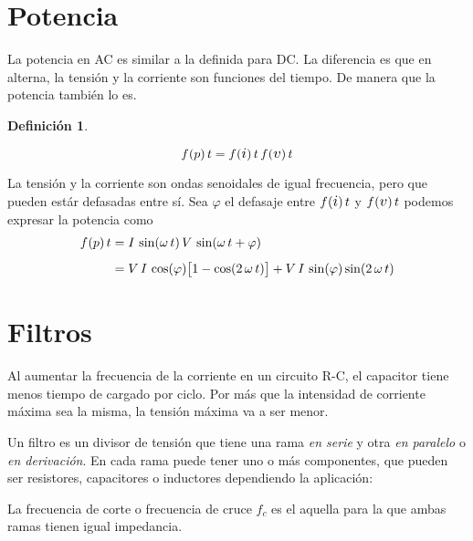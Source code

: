 \documentclass[a5paper,12pt,twoside]{book}
\newtheorem{defn}{{Definición}}[chapter]
\begin{document}
\section{Potencia}

La potencia en AC es similar a la definida para DC.
La diferencia es que en alterna, la tensión y la corriente son funciones del tiempo.
De manera que la potencia también lo es.

\begin{mdframed}[style=MyFrame1]
    \begin{defn}
    \end{defn}
    \begin{equation*}
        \fx{p}{t} = \fx{\current}{t} \, \fx{\voltage}{t}
    \end{equation*}
\end{mdframed}

La tensión y la corriente son ondas senoidales de igual frecuencia, pero que pueden estár defasadas entre sí.
Sea $\varphi$ el defasaje entre $\fx{\current}{t}$ y $\fx{\voltage}{t}$ podemos expresar la potencia como
\begin{align*}
    f \hspace{-0.5mm} \left( p \right){t} &= I \, \sin (\omega \, t) \, V \, \sin (\omega \, t + \varphi)
    \\[1ex]
    &= V \, I \, \cos (\varphi) { \begin{bmatrix} 1 - \cos(2 \, \omega \, t) \end{bmatrix} } + V \, I \, \sin (\varphi) \sin (2 \, \omega \, t)
\end{align*}


\section{Filtros}

Al aumentar la frecuencia de la corriente en un circuito R-C, el capacitor tiene menos tiempo de cargado por ciclo.
Por más que la intensidad de corriente máxima sea la misma, la tensión máxima va a ser menor.

Un filtro es un divisor de tensión que tiene una rama \emph{en serie} y otra \emph{en paralelo} o \emph{en derivación}.
En cada rama puede tener uno o más componentes, que pueden ser resistores, capacitores o inductores dependiendo la aplicación:

\begin{center}
    \def\svgwidth{0.6\linewidth}
    
\end{center}

La frecuencia de corte o frecuencia de cruce $f_c$ es el aquella para la que ambas ramas tienen igual impedancia.
\end{document}
